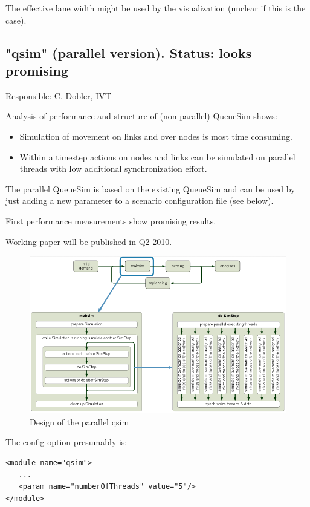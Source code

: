 The effective lane width might be used by the visualization (unclear if this is the case).

\vfill\eject
\subsection{"qsim" (parallel version). Status: looks promising}

Responsible: C. Dobler, IVT

Analysis of performance and structure of (non parallel) QueueSim shows:
\begin{itemize}
	\item Simulation of movement on links and over nodes is most time consuming.
	\item Within a timestep actions on nodes and links can be simulated on parallel threads with low additional synchronization effort.
\end{itemize}

The  parallel QueueSim is based on the existing QueueSim and can be used by  just adding a new parameter to a scenario configuration file (see  below).

First performance measurements show promising results.

Working paper will be published in Q2 2010.

\begin{figure}[htp]
\includegraphics[width=\textwidth]{figures/qsimParallel/parallelqsim.png}
\caption{Design of the parallel qsim}
\end{figure}

The config option presumably is:
\begin{lstlisting}
<module name="qsim">
   ...
   <param name="numberOfThreads" value="5"/>
</module>

\end{lstlisting}

